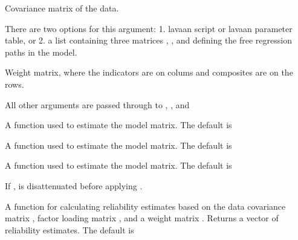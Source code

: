\documentclass[a4paper]{book}
\begin{document}
\begin{Arguments}
\begin{ldescription}
\item[\code{S}] Covariance matrix of the data.

\item[\code{model}] There are two options for this argument: 1. lavaan script or lavaan parameter
table, or 2. a list containing three matrices
, , and  defining the free regression paths
in the model.

\item[\code{W}] Weight matrix, where the indicators are on colums and composites are on the rows.

\item[\code{...}] All other arguments are passed through to ,
, and

\item[\code{parametersInner}] A function used to estimate the  model matrix. The default is

\item[\code{parametersReflective}] A function used to estimate the  model matrix. The
default is 

\item[\code{parametersFormative}] A function used to estimate the  model matrix. The
default is 

\item[\code{disattenuate}] If ,  is
disattenuated before applying .

\item[\code{reliabilities}] A function for calculating reliability estimates based on the 
data covariance matrix , factor loading matrix , and a weight matrix .
Returns a vector of reliability estimates. The default is
\end{ldescription}
\end{Arguments}
%
\end{document}
